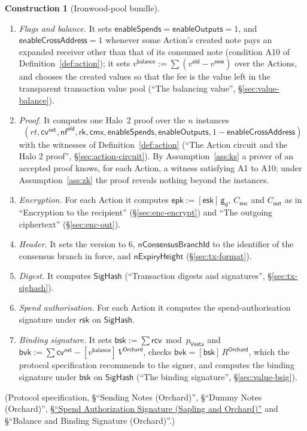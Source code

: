 \documentclass[11pt,a4paper]{article}
\theoremstyle{definition}
\newtheorem{construction}[theorem]{Construction}
\newcommand{\PP}{\mathbb{P}}
\newcommand{\nfsym}{\mathsf{nf}}
\newcommand{\cmx}{\mathsf{cmx}}
\newcommand{\cvsym}{\mathsf{cv}}
\newcommand{\rk}{\mathsf{rk}}
\newcommand{\Vesta}{\ensuremath{\mathsf{Vesta}}}
\newcommand{\ask}{\ensuremath{\mathsf{ask}}}
\newcommand{\aksym}{\ensuremath{\mathsf{ak}}}
\newcommand{\gd}{\ensuremath{\mathsf{g_d}}}
\newcommand{\rcv}{\ensuremath{\mathsf{rcv}}}
\newcommand{\rsk}{\ensuremath{\mathsf{rsk}}}
\begin{document}
\begin{construction}[Ironwood-pool bundle]
\begin{enumerate}[label=(\arabic*)]
  $\mathsf{GenRandom}$ and sets $\rsk := \ask + \alpha$ and
  $\rk := \aksym^{\PP} + [\alpha]\,G^{\mathsf{SpendAuth}}$ (``Randomised
  validating keys'', \S\ref{sec:spendauth-rk}), with $\ask$ and
  $\aksym^{\PP}$ of the consumed note's spending key, the dummy key for a
  dummy spend.
\item \emph{Flags and balance.} It sets $\mathsf{enableSpends} =
  \mathsf{enableOutputs} = 1$, and $\mathsf{enableCrossAddress} = 1$
  whenever some Action's created note pays an expanded receiver other than
  that of its consumed note (condition A10 of
  Definition~\ref{def:action}); it sets
  $v^{\mathsf{balance}} := \sum (v^{\mathsf{old}} - v^{\mathsf{new}})$ over
  the Actions, and chooses the created values so that the fee is the value
  left in the transparent transaction value pool (``The balancing value'',
  \S\ref{sec:value-balance}).
\item \emph{Proof.} It computes one Halo~2 proof over the $n$ instances
  \[
    (\mathit{rt}, \cvsym^{\mathsf{net}}, \nfsym^{\mathsf{old}}, \rk, \cmx,
    \mathsf{enableSpends}, \mathsf{enableOutputs},
    1 - \mathsf{enableCrossAddress})
  \]
  with the witnesses of
  Definition~\ref{def:action} (``The Action circuit and the Halo 2 proof'',
  \S\ref{sec:action-circuit}). By Assumption~\ref{ass:ks} a prover of an
  accepted proof knows, for each Action, a witness satisfying A1 to A10;
  under Assumption~\ref{ass:zk} the proof reveals nothing beyond the
  instances.
\item \emph{Encryption.} For each Action it computes
  $\mathsf{epk} := [\mathsf{esk}]\,\gd$, $C_{\mathsf{enc}}$ and
  $C_{\mathsf{out}}$ as in ``Encryption to the recipient''
  (\S\ref{sec:enc-encrypt}) and ``The outgoing ciphertext''
  (\S\ref{sec:enc-out}).
\item \emph{Header.} It sets the version to $6$,
  $\mathsf{nConsensusBranchId}$ to the identifier of the consensus branch in
  force, and $\mathsf{nExpiryHeight}$ (\S\ref{sec:tx-format}).
\item \emph{Digest.} It computes $\mathsf{SigHash}$ (``Transaction digests
  and signatures'', \S\ref{sec:tx-sighash}).
\item \emph{Spend authorisation.} For each Action it computes the
  spend-authorisation signature under $\rsk$ on $\mathsf{SigHash}$.
\item \emph{Binding signature.} It sets
  $\mathsf{bsk} := \sum \rcv \bmod p_{\Vesta}$ and
  $\mathsf{bvk} := \sum \cvsym^{\mathsf{net}} -
  [v^{\mathsf{balance}}]\,V^{\mathsf{Orchard}}$, checks
  $\mathsf{bvk} = [\mathsf{bsk}]\,R^{\mathsf{Orchard}}$, which the protocol
  specification recommends to the signer, and computes the binding
  signature under $\mathsf{bsk}$ on $\mathsf{SigHash}$ (``The binding
  signature'', \S\ref{sec:value-bsig}).
\end{enumerate}
(Protocol specification, \S``Sending Notes (Orchard)'', \S``Dummy Notes
(Orchard)'',
\href{https://zips.z.cash/protocol/protocol.pdf#spendauthsig}%
{\S``Spend Authorization Signature (Sapling and Orchard)''} and
\S``Balance and Binding Signature (Orchard)''.)
\end{construction}
\end{document}
